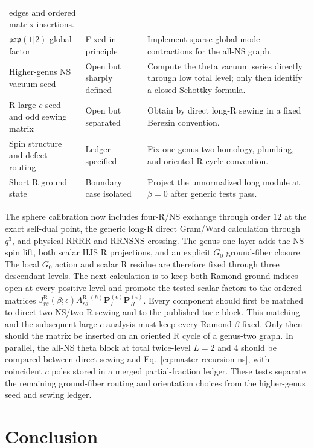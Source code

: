 \documentclass[11pt]{article}
\newcommand{\R}{\mathrm{R}}
\newcommand{\osp}{\mathfrak{osp}(1|2)}
\begin{document}
\begin{center}
\begin{tabularx}{\textwidth}{@{}L{0.30\textwidth}L{0.18\textwidth}X@{}}
edges and ordered matrix insertions.\\
$\osp$ global factor & Fixed in principle & Implement sparse global-mode
contractions for the all-NS graph.\\
Higher-genus NS vacuum seed & Open but sharply defined & Compute the theta
vacuum series directly through low total level; only then identify a closed
Schottky formula.\\
R large-$c$ seed and odd sewing matrix & Open but separated & Obtain by
direct long-R sewing in a fixed Berezin convention.\\
Spin structure and defect routing & Ledger specified & Fix one genus-two
homology, plumbing, and oriented R-cycle convention.\\
Short R ground state & Boundary case isolated & Project the unnormalized
long module at $\beta=0$ after generic tests pass.\\
\bottomrule
\end{tabularx}
\end{center}

The sphere calibration now includes four-R/NS exchange through order $12$ at
the exact self-dual point, the generic long-R direct Gram/Ward calculation
through $q^3$, and physical RRRR and RRNSNS crossing.  The genus-one layer
adds the NS spin lift, both scalar HJS R projections, and an explicit
$G_0$ ground-fiber closure.  The local $G_0$ action and scalar R residue are
therefore fixed through three descendant levels.  The next calculation is
to keep both Ramond ground indices open at every positive level and promote
the tested scalar factors to the ordered matrices
$J^{\R}_{rs}(\beta;\epsilon)A^{\R,(h)}_{rs}
\mathbf P_L^{(\epsilon)}\mathbf P_R^{(\epsilon)}$.  Every component should
first be matched to direct two-NS/two-R sewing and to the published toric
block.  This matching and the subsequent large-\(c\) analysis must keep
every Ramond \(\beta\) fixed.  Only then should the matrix be inserted on an
oriented R cycle of a genus-two graph.  In parallel, the all-NS theta block
at total twice-level
$L=2$ and $4$ should be compared between direct sewing and
Eq.~\eqref{eq:master-recursion-ns}, with coincident $c$ poles stored in a
merged partial-fraction ledger.  These tests separate the remaining
ground-fiber routing and orientation choices from the higher-genus seed and
sewing ledger.

\section{Conclusion}
\end{document}
